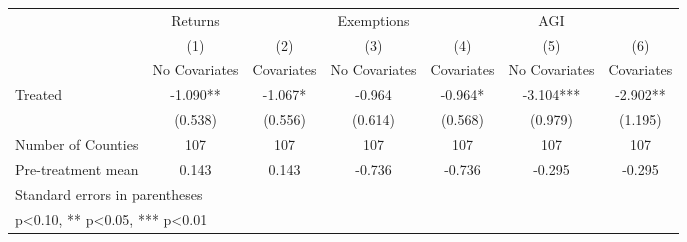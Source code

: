 {
\def\sym#1{\ifmmode^{#1}\else\(^{#1}\)\fi}
\begin{tabular}{l*{6}{c}}
\hline\hline
            &     Returns   &               &  Exemptions   &               &         AGI   &               \\
            &\multicolumn{1}{c}{(1)}&\multicolumn{1}{c}{(2)}&\multicolumn{1}{c}{(3)}&\multicolumn{1}{c}{(4)}&\multicolumn{1}{c}{(5)}&\multicolumn{1}{c}{(6)}\\
            &\multicolumn{1}{c}{No Covariates}&\multicolumn{1}{c}{Covariates}&\multicolumn{1}{c}{No Covariates}&\multicolumn{1}{c}{Covariates}&\multicolumn{1}{c}{No Covariates}&\multicolumn{1}{c}{Covariates}\\
\hline
Treated     &      -1.090** &      -1.067*  &      -0.964   &      -0.964*  &      -3.104***&      -2.902** \\
            &     (0.538)   &     (0.556)   &     (0.614)   &     (0.568)   &     (0.979)   &     (1.195)   \\
\hline
Number of Counties&         107   &         107   &         107   &         107   &         107   &         107   \\
Pre-treatment mean&       0.143   &       0.143   &      -0.736   &      -0.736   &      -0.295   &      -0.295   \\
\hline\hline
\multicolumn{7}{l}{\footnotesize Standard errors in parentheses}\\
\multicolumn{7}{l}{\footnotesize * p<0.10, ** p<0.05, *** p<0.01}\\
\end{tabular}
}

